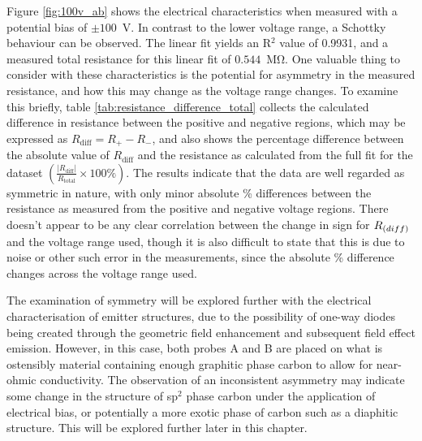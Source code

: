 \begin{refsection}
Figure \ref{fig:100v_ab} shows the electrical characteristics when measured with a potential bias of $\pm100$~\si{\volt}. In contrast to the lower voltage range, a Schottky behaviour can be observed. The linear fit yields an R$^{2}$ value of 0.9931, and a measured total resistance for this linear fit of $0.544$~\si{\mega\ohm}. One valuable thing to consider with these characteristics is the potential for asymmetry in the measured resistance, and how this may change as the voltage range changes. To examine this briefly, table \ref{tab:resistance_difference_total} collects the calculated difference in resistance between the positive and negative regions, which may be expressed as $R_{\text{diff}} = R_{+} - R_{-}$, and also shows the percentage difference between the absolute value of $R_{\text{diff}}$ and the resistance as calculated from the full fit for the dataset $\left(\frac{\left| R_{\text{diff}} \right|}{R_{\text{total}}} \times 100\%\right)$. The results indicate that the data are well regarded as symmetric in nature, with only minor absolute \% differences between the resistance as measured from the positive and negative voltage regions. There doesn't appear to be any clear correlation between the change in sign for $R_{\text(diff)}$ and the voltage range used, though it is also difficult to state that this is due to noise or other such error in the measurements, since the absolute \% difference changes across the voltage range used. 

The examination of symmetry will be explored further with the electrical characterisation of emitter structures, due to the possibility of one-way diodes being created through the geometric field enhancement and subsequent field effect emission. However, in this case, both probes A and B are placed on what is ostensibly material containing enough graphitic phase carbon to allow for near-ohmic conductivity. The observation of an inconsistent asymmetry may indicate some change in the structure of sp$^{2}$ phase carbon under the application of electrical bias, or potentially a more exotic phase of carbon such as a diaphitic structure. This will be explored further later in this chapter.


\end{refsection}
